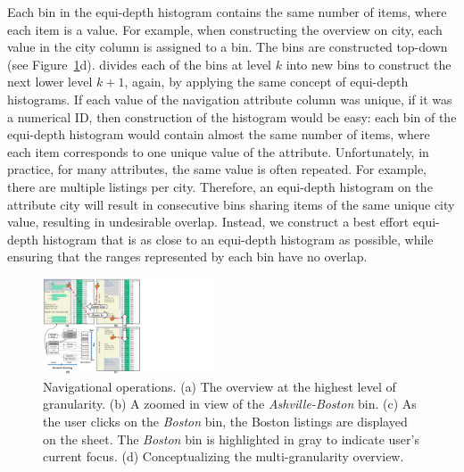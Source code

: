Each bin in the equi-depth histogram
contains the same number of items,
where each item is a value.
For example,
when constructing the overview
on city,
each value in the city column
is assigned to a bin.
The bins are constructed top-down
(see Figure~\ref{fig:concept}d). \noah divides
each of the bins at level $k$ into new bins
to construct the next lower level $k+1$, again,
by applying the same concept of equi-depth histograms.
If each value of the navigation attribute
column was unique, \eg if it was a numerical ID,
then construction of the histogram would be easy:
each bin of the equi-depth histogram
would contain almost the same number of items,
where each item corresponds to one unique value of
the attribute.
Unfortunately, in practice, for many attributes,
the same value is often repeated.
For example,
there are multiple listings
per city.
Therefore,
an equi-depth histogram
on the
attribute city
will result in consecutive bins
sharing items of
the same unique city value,
resulting in undesirable overlap.
Instead,
we construct a best effort
equi-depth
histogram that is as close to an equi-depth
histogram as possible, while ensuring
that the ranges represented by each bin have no overlap.


\begin{figure}[t]
        \centering
        \includegraphics[width=0.45\textwidth,trim={0 0 400 0},clip]{images/navigationOp.pdf}
\vspace{-10pt}
   \caption{Navigational operations. (a) The overview at the highest level of granularity. (b) A zoomed in view of the \emph{Ashville-Boston} bin. (c) As the user clicks on the \emph{Boston} bin, the Boston listings are displayed on the sheet. The \emph{Boston} bin is highlighted in gray to indicate user’s current focus. (d) Conceptualizing the multi-granularity overview. }
\vspace{-18pt}
   \label{fig:concept}
 \end{figure}

